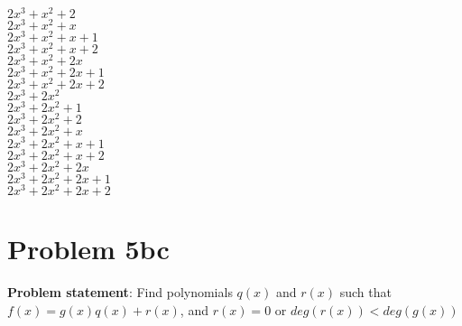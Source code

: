 \documentclass{article} %
\begin{document}
\begin{addmargin}[1em]{0em}
\begin{multicols}{2}
\\$2x^3 + x^2 + 2$
\\$2x^3 + x^2 + x$
\\$2x^3 + x^2 + x + 1$
\\$2x^3 + x^2 + x + 2$
\\$2x^3 + x^2 + 2x$
\\$2x^3 + x^2 + 2x + 1$
\\$2x^3 + x^2 + 2x + 2$
\\$2x^3 + 2x^2$
\\$2x^3 + 2x^2 + 1$
\\$2x^3 + 2x^2 + 2$
\\$2x^3 + 2x^2 + x$
\\$2x^3 + 2x^2 + x + 1$
\\$2x^3 + 2x^2 + x + 2$
\\$2x^3 + 2x^2 + 2x$
\\$2x^3 + 2x^2 + 2x + 1$
\\$2x^3 + 2x^2 + 2x + 2$
\end{multicols}
\end{addmargin}
\newpage
\section*{Problem 5bc}
\textbf{Problem statement}: Find polynomials $q(x)$ and $r(x)$ such that $f(x) = g(x)q(x) + r(x)$, and $r(x)=0$ or $deg(r(x)) < deg(g(x))$
\\
\end{document}

